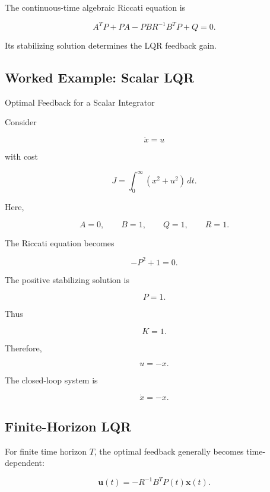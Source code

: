The continuous-time algebraic Riccati equation is

\[
\boxed{
A^TP
+
PA
-
PBR^{-1}B^TP
+
Q
=
0.
}
\]

Its stabilizing solution determines the LQR feedback gain.

\subsection{Worked Example: Scalar LQR}
\label{subsec:worked-scalar-lqr}

\begin{workedexamplebox}{Optimal Feedback for a Scalar Integrator}

Consider

\[
\dot{x}=u
\]

with cost

\[
J
=
\int_0^\infty
(x^2+u^2)\,dt.
\]

Here,

\[
A=0,
\qquad
B=1,
\qquad
Q=1,
\qquad
R=1.
\]

The Riccati equation becomes

\[
-P^2+1=0.
\]

The positive stabilizing solution is

\[
P=1.
\]

Thus

\[
K=1.
\]

Therefore,

\begin{answerbox}
\[
\boxed{
u=-x.
}
\]
\end{answerbox}

The closed-loop system is

\[
\dot{x}=-x.
\]

\end{workedexamplebox}

\subsection{Finite-Horizon LQR}
\label{subsec:finite-horizon-lqr}

For finite time horizon \(T\), the optimal feedback generally becomes
time-dependent:

\[
\boxed{
\mathbf{u}(t)
=
-R^{-1}B^TP(t)\mathbf{x}(t).
}
\]

